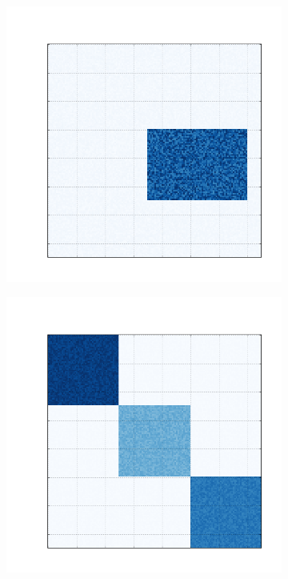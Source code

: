 \documentclass[
    12pt,                %
    oneside,            %
    a4paper,            %
    english,            %
    brazil                %
    ]{abntex2ppgsi}
\begin{document}
\begin{figure}[H]
\centering
    \caption{
        As primeiras cinco matrizes são as matrizes originais, as demais são suas respectivas reconstruções, realizadas a partir dos resultados obtidos com o algoritmo \textit{FNMTF}.
    }
    \begin{subfigure}[b]{0.18\textwidth}
        \includegraphics[width=\textwidth]{img/a-bic-structure.png}
    \end{subfigure}
    \begin{subfigure}[b]{0.18\textwidth}
        \includegraphics[width=\textwidth]{img/b-bic-structure.png}

\end{subfigure}
\end{figure}
\end{document}
